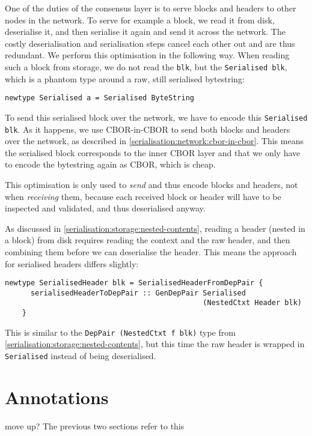 One of the duties of the consensus layer is to serve blocks and headers to other
nodes in the network. To serve for example a block, we read it from
disk, deserialise it, and then serialise it again and send it across the
network. The costly deserialisation and serialisation steps cancel each other
out and are thus redundant. We perform this optimisation in the following way.
When reading such a block from storage, we do not read the \lstinline!blk!, but
the \lstinline!Serialised blk!, which is a phantom type around a raw, still
serialised bytestring:
\begin{lstlisting}
newtype Serialised a = Serialised ByteString
\end{lstlisting}
To send this serialised block over the network, we have to encode this
\lstinline!Serialised blk!. As it happens, we use CBOR-in-CBOR to send both
blocks and headers over the network, as described in
\cref{serialisation:network:cbor-in-cbor}. This means the serialised block
corresponds to the inner CBOR layer and that we only have to encode the
bytestring again as CBOR, which is cheap.

This optimisation is only used to \emph{send} and thus encode blocks and
headers, not when \emph{receiving} them, because each received block or header
will have to be inspected and validated, and thus deserialised anyway.

As discussed in \cref{serialisation:storage:nested-contents}, reading a header
(nested in a block) from disk requires reading the context and the raw header,
and then combining them before we can deserialise the header. This means the
approach for serialised headers differs slightly:
\begin{lstlisting}
newtype SerialisedHeader blk = SerialisedHeaderFromDepPair {
      serialisedHeaderToDepPair :: GenDepPair Serialised
                                              (NestedCtxt Header blk)
    }
\end{lstlisting}
This is similar to the \lstinline!DepPair (NestedCtxt f blk)! type from
\cref{serialisation:storage:nested-contents}, but this time the raw header is
wrapped in \lstinline!Serialised! instead of being deserialised.

\section{Annotations}
\label{serialisation:annotations}

 move up? The previous two sections refer to this

